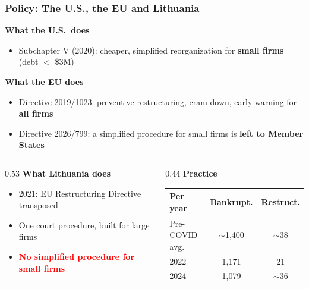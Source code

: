\documentclass[aspectratio=169,xcolor=table]{beamer}
\begin{document}
\begin{frame}[label=policy] \frametitle{Policy: The U.S., the EU and Lithuania \hfill \hyperlink{sources}{}}

\textbf{What the U.S.\ does} \hfill \hyperlink{sbra_data}{}
\begin{itemize} \small
    \item Subchapter V (2020): cheaper, simplified reorganization for \textbf{small firms} (debt $<$ \$3M)
\end{itemize} \normalsize

\textbf{What the EU does}
\begin{itemize} \small
    \item Directive 2019/1023: preventive restructuring, cram-down, early warning for \textbf{all firms}
    \item Directive 2026/799: a simplified procedure for small firms is \textbf{left to Member States}
\end{itemize} \normalsize \vspace{1mm}

\begin{columns}[T,onlytextwidth]
\begin{column}{0.53\textwidth}
    \vspace{5mm} 
\textbf{What Lithuania does}
\begin{itemize} \small
    \item 2021: EU Restructuring Directive transposed
    \item One court procedure, built for large firms
    \item \textcolor{red}{\textbf{No simplified procedure for small firms}}
\end{itemize}
\end{column}
\begin{column}{0.44\textwidth}
\textbf{Practice} \\[1mm]
\footnotesize
\renewcommand{\arraystretch}{0.95}
\begin{tabular}{lcc}
\toprule
\textbf{Per year} & \textbf{Bankrupt.} & \textbf{Restruct.} \\
\midrule
Pre-COVID avg.  & $\sim$1,400 & $\sim$38 \\
2022            & 1,171 & 21 \\
2024            & 1,079 & $\sim$36 \\
\bottomrule
\end{tabular} \vspace{1mm}

\end{column}
\end{columns}

\end{frame}
\end{document}
